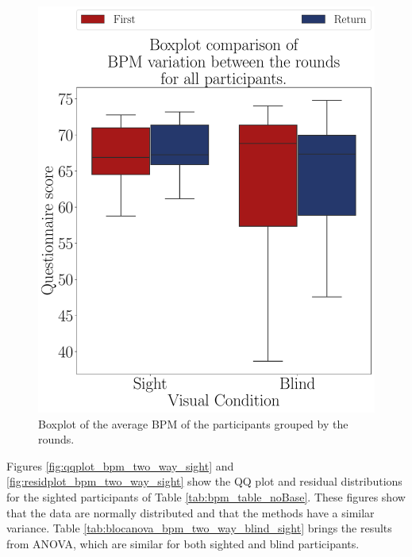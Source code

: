 \begin{figure}[!htb]
\begin{minipage}{0.45\textwidth}
        \includegraphics[width = \textwidth]{Resultados/ECG/Figuras/pdf/boxplot_ecg_bpm_4_rounds.pdf}
        \caption{Boxplot of the average BPM of the participants grouped by the rounds.}
        \label{fig:boxplot_ecg_bpm_4_rounds}
    \end{minipage}
\end{figure}
 
%
%

Figures \ref{fig:qqplot_bpm_two_way_sight} and \ref{fig:residplot_bpm_two_way_sight} show the QQ plot and residual distributions for the sighted participants of Table \ref{tab:bpm_table_noBase}. These figures show that the data are normally distributed and that the methods have a similar variance. Table \ref{tab:blocanova_bpm_two_way_blind_sight} brings the results from ANOVA, which are similar for both sighted and blind participants.


